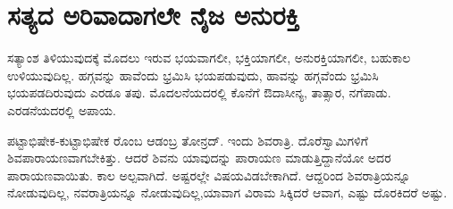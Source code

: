 \section*{ಸತ್ಯದ ಅರಿವಾದಾಗಲೇ ನೈಜ ಅನುರಕ್ತಿ}

ಸತ್ಯಾಂಶ ತಿಳಿಯುವುದಕ್ಕೆ ಮೊದಲು ಇರುವ ಭಯವಾಗಲೀ, ಭಕ್ತಿಯಾಗಲೀ, ಅನುರಕ್ತಿಯಾಗಲೀ, ಬಹುಕಾಲ ಉಳಿಯುವುದಿಲ್ಲ. ಹಗ್ಗವನ್ನು ಹಾವೆಂದು ಭ್ರಮಿಸಿ ಭಯಪಡುವುದು, ಹಾವನ್ನು ಹಗ್ಗವೆಂದು ಭ್ರಮಿಸಿ ಭಯಪಡದಿರುವುದು ಎರಡೂ ತಪು. ಮೊದಲನೆಯದರಲ್ಲಿ ಕೊನೆಗೆ ಔದಾಸೀನ್ಯ, ತಾತ್ಸಾರ, ನಗೆಪಾಡು. ಎರಡನೆಯದರಲ್ಲಿ ಅಪಾಯ.

ಪಟ್ಟಾಭಿಷೇಕ-ಕುಟ್ಟಾಭಿಷೇಕ  ರೊಂಬ ಆಡಂಬ್ರ ತೋನ್ರದ್. ಇಂದು  ಶಿವರಾತ್ರಿ. ದೊರೆಸ್ವಾಮಿಗಳಿಗೆ ಶಿವಪಾರಾಯಣವಾಗಬೇಕಿತ್ತು. ಆದರೆ ಶಿವನು ಯಾವುದನ್ನು ಪಾರಾಯಣ ಮಾಡುತ್ತಿದ್ದಾನೆಯೋ ಅದರ ಪಾರಾಯಣವಾಯಿತು. ಕಾಲ ಅಲ್ಪವಾಗಿದೆ. ಅಷ್ಟರಲ್ಲೇ ವಿಷಯವಿಡಬೇಕಾಗಿದೆ. ಆದ್ದರಿಂದ ಶಿವರಾತ್ರಿಯನ್ನೂ  ನೋಡುವುದಿಲ್ಲ, ನವರಾತ್ರಿಯನ್ನೂ ನೋಡುವುದಿಲ್ಲ,ಯಾವಾಗ ವಿರಾಮ ಸಿಕ್ಕಿದರೆ ಆವಾಗ, ಎಷ್ಟು ದೊರಕಿದರೆ ಅಷ್ಟು. 


